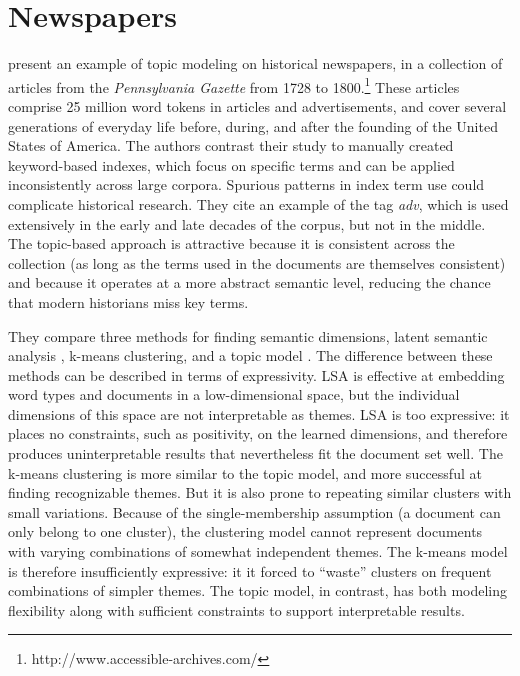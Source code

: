 
\section{Newspapers}

\cite{newman-06} present an example of topic modeling on historical newspapers, in a collection of articles from the {\em Pennsylvania Gazette} from 1728 to 1800.\footnote{http://www.accessible-archives.com/}
These articles comprise 25 million word tokens in articles and advertisements, and cover several generations of everyday life before, during, and after the founding of the United States of America.
The authors contrast their study to manually created keyword-based indexes, which focus on specific terms and can be applied inconsistently across large corpora.
Spurious patterns in index term use could complicate historical research. 
They cite an example of the tag {\em adv}, which is used extensively in the early and late decades of the corpus, but not in the middle.
The topic-based approach is attractive because it is consistent across the collection (as long as the terms used in the documents are themselves consistent) and because it operates at a more abstract semantic level, reducing the chance that modern historians miss key terms. 

They compare three methods for finding semantic dimensions, latent semantic analysis \citep{deerwester-90}, k-means clustering, and a topic model \citep{hofmann-99}.
The difference between these methods can be described in terms of expressivity.
LSA is effective at embedding word types and documents in a low-dimensional space, but the individual dimensions of this space are not interpretable as themes.
LSA is too expressive: it places no constraints, such as positivity, on the learned dimensions, and therefore produces uninterpretable results that nevertheless fit the document set well.
The k-means clustering is more similar to the topic model, and more successful at finding recognizable themes.
But it is also prone to repeating similar clusters with small variations.
Because of the single-membership assumption (a document can only belong to one cluster), the clustering model cannot represent documents with varying combinations of somewhat independent themes.
The k-means model is therefore insufficiently expressive: it it forced to ``waste'' clusters on frequent combinations of simpler themes.
The topic model, in contrast, has both modeling flexibility along with sufficient  constraints to support interpretable results.

